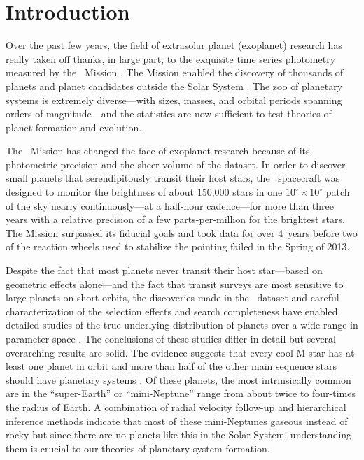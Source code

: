 \chapter*{Introduction}

Over the past few years, the field of extrasolar planet (exoplanet) research
has really taken off thanks, in large part, to the exquisite time series
photometry measured by the \kepler\ Mission \citep{Borucki:2010}.
The Mission enabled the discovery of thousands of planets and planet
candidates outside the Solar System \citep{Rowe:2015}.
The zoo of planetary systems is extremely diverse---with sizes, masses, and
orbital periods spanning orders of magnitude---and the statistics are now
sufficient to test theories of planet formation and evolution.

The \kepler\ Mission has changed the face of exoplanet research because of its
photometric precision and the sheer volume of the dataset.
In order to discover small planets that serendipitously transit their host
stars, the \kepler\ spacecraft was designed to monitor the brightness of about
150,000 stars in one $10^\circ \times 10^\circ$ patch of the sky nearly
continuously---at a half-hour cadence---for more than three years with a
relative precision of a few parts-per-million for the brightest stars.
The Mission surpassed its fiducial goals and took data for over 4~years before
two of the reaction wheels used to stabilize the pointing failed in the Spring
of 2013.

Despite the fact that most planets never transit their host star---based on
geometric effects alone---and the fact that transit surveys are most sensitive
to large planets on short orbits, the discoveries made in the \kepler\ dataset
and careful characterization of the selection effects and search completeness
have enabled detailed studies of the true underlying distribution of planets
over a wide range in parameter space \citep[examples include][and
]{Howard:2012, Petigura:2013, Foreman-Mackey:2014,
Dressing:2015}.
The conclusions of these studies differ in detail but several overarching
results are solid.
The evidence suggests that every cool M-star has at least one planet in orbit
\citep{Dressing:2013, Dressing:2015} and more than half of the other main
sequence stars should have planetary systems \citep{Howard:2012, Fressin:2013,
Petigura:2013, Foreman-Mackey:2014}.
Of these planets, the most intrinsically common are in the ``super-Earth'' or
``mini-Neptune'' range from about twice to four-times the radius of Earth.
A combination of radial velocity follow-up and hierarchical inference methods
indicate that most of these mini-Neptunes gaseous instead of rocky
\citep{Weiss:2014, Rogers:2015} but since there are no planets like this in
the Solar System, understanding them is crucial to our theories of planetary
system formation.

